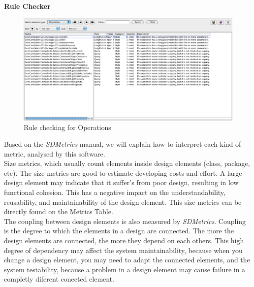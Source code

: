 \textbf{Rule Checker}
\begin{figure}[H]
\begin{center}
\includegraphics[width=1\textwidth]{images/rule.png}
\caption{Rule checking for Operations}\label{img:rule}
\end{center}
\end{figure} 

Based on the \textit{SDMetrics} manual, we will explain how to interpret each kind of metric, analysed by this software. \\
Size metrics, which usually count elements inside design elements (class, package, etc). The size metrics are good to estimate developing costs and effort. A large design element may indicate that it suffer's from poor design, resulting in low functional cohesion. This 	has a negative impact on the understandability, reusability, and maintainability of the design element. This size metrics can be directly found on the Metrics Table.\\
The coupling between design elements is also measured by \textit{SDMetrics}. Coupling is the degree to which the elements in a design are connected. The more the design elements are connected, the more they depend on each others. This high degree of dependency may affect the system maintainability, because when you change a design element, you may need to adapt the connected elements, and the system testability, because a problem in a design element may cause failure in a completly diferent conected element.\\

 
